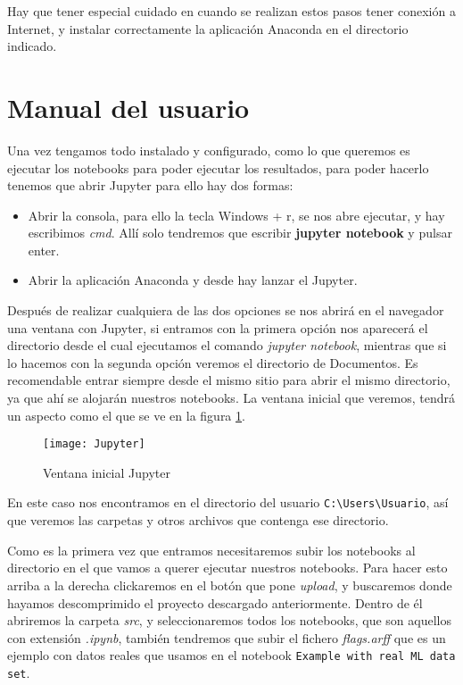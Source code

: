 Hay que tener especial cuidado en cuando se realizan estos pasos tener conexión a Internet, y instalar correctamente la aplicación Anaconda en el directorio indicado.
\section{Manual del usuario}
Una vez tengamos todo instalado y configurado, como lo que queremos es ejecutar los notebooks para poder ejecutar los resultados, para poder hacerlo tenemos que abrir Jupyter para ello hay dos formas:
\begin{itemize}
	\item Abrir la consola, para ello la tecla Windows + r, se nos abre ejecutar, y hay escribimos \textit{cmd}. Allí solo tendremos que escribir \textbf{jupyter notebook} y pulsar enter.
	\item Abrir la aplicación Anaconda y desde hay lanzar el Jupyter.
\end{itemize}
Después de realizar cualquiera de las dos opciones se nos abrirá en el navegador una ventana con Jupyter, si entramos con la primera opción nos aparecerá el directorio desde el cual ejecutamos el comando \textit{jupyter notebook}, mientras que si lo hacemos con la segunda opción veremos el directorio de Documentos. Es recomendable entrar siempre desde el mismo sitio para abrir el mismo directorio, ya que ahí se alojarán nuestros notebooks. La ventana inicial que veremos, tendrá un aspecto como el que se ve en la figura \ref{fig:Jupyter}.

\begin{figure}
\centering
\texttt{[image: Jupyter]}
\caption{Ventana inicial Jupyter}
\label{fig:Jupyter}
\end{figure}

En este caso nos encontramos en el directorio del usuario \texttt{C:\textbackslash Users\textbackslash Usuario}, así que veremos las carpetas y otros archivos que contenga ese directorio.

Como es la primera vez que entramos necesitaremos subir los notebooks al directorio en el que vamos a querer ejecutar nuestros notebooks. 
Para hacer esto arriba a la derecha clickaremos en el botón que pone \textit{upload}, y buscaremos donde hayamos descomprimido el proyecto descargado anteriormente. Dentro de él abriremos la carpeta \textit{src}, y seleccionaremos todos los notebooks, que son aquellos con extensión \textit{.ipynb}, también tendremos que subir el fichero \textit{flags.arff} que es un ejemplo con datos reales que usamos en el notebook \texttt{Example with real ML data set}.

